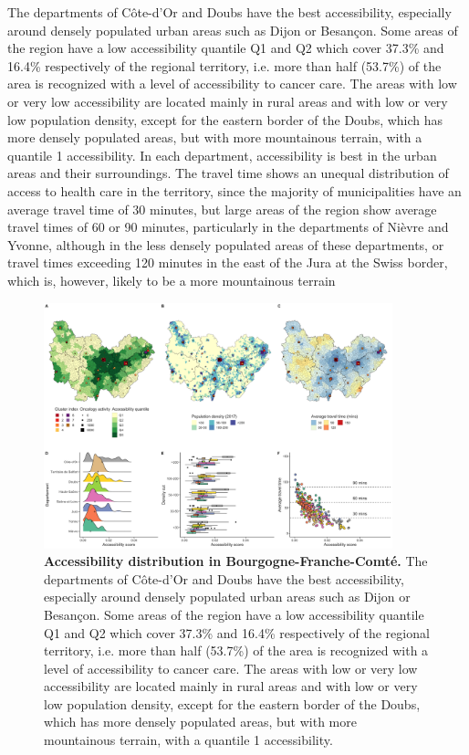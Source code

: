 The departments of Côte-d'Or and Doubs have the best accessibility, especially
around densely populated urban areas such as Dijon or Besançon. Some areas of
the region have a low accessibility quantile Q1 and Q2 which cover 37.3\% and
16.4\% respectively of the regional territory, i.e. more than half (53.7\%) of
the area is recognized with a level of accessibility to cancer care. The areas
with low or very low accessibility are located mainly in rural areas and with
low or very low population density, except for the eastern border of the Doubs,
which has more densely populated areas, but with more mountainous terrain, with
a quantile 1 accessibility. In each department, accessibility is best in the
urban areas and their surroundings. The travel time shows an unequal
distribution of access to health care in the territory, since the majority of
municipalities have an average travel time of 30 minutes, but large areas of the
region show average travel times of 60 or 90 minutes, particularly in the
departments of Nièvre and Yvonne, although in the less densely populated areas
of these departments, or travel times exceeding 120 minutes in the east of the
Jura at the Swiss border, which is, however, likely to be a more mountainous
terrain

\begin{figure}[h!]
    \includegraphics[width=0.9\textwidth]{images/camion/region_accessibility/accessibility_Bourgogne-Franche-Comte.png}
    \centering
    \caption{ \textbf{Accessibility distribution in Bourgogne-Franche-Comté.}
        The departments of Côte-d'Or and Doubs have the best accessibility,
        especially around densely populated urban areas such as Dijon or
        Besançon. Some areas of the region have a low accessibility quantile Q1
        and Q2 which cover 37.3\% and 16.4\% respectively of the regional
        territory, i.e. more than half (53.7\%) of the area is recognized with a
        level of accessibility to cancer care. The areas with low or very low
        accessibility are located mainly in rural areas and with low or very low
        population density, except for the eastern border of the Doubs, which
        has more densely populated areas, but with more mountainous terrain,
        with a quantile 1 accessibility. }
\end{figure}

